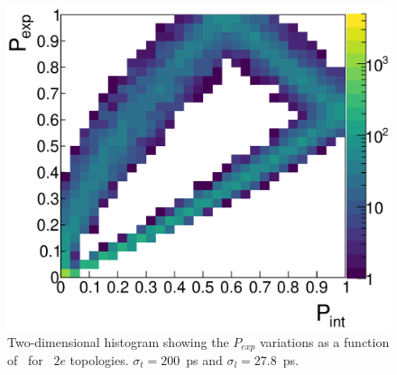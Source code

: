 \begin{figure}[!h]
  \centering
  \includegraphics[width=15cm]{timedifference/fig_timediff/PintVSPexp_208Tl_200.eps}
  \caption{Two-dimensional histogram showing the $P_{exp}$ variations as a function of \Pint\ for \Tl\ $2e$ topologies.
    $\sigma_{t}=200$~ps and $\sigma_{l}=27.8$~ps.
    \label{fig:biplot_Pexp_Pint}}
\end{figure}
